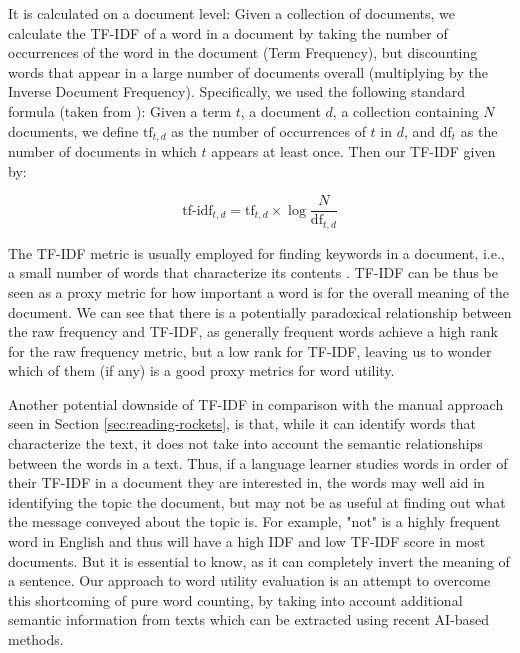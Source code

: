 It is calculated on a document level:
Given a collection of documents, we calculate the TF-IDF of a word in a document by taking the number of occurrences of the word in the document (Term Frequency), but discounting words that appear in a large number of documents overall (multiplying by the Inverse Document Frequency).
Specifically, we used the following standard formula (taken from \cite{qaiserTextMiningUse2018}):
Given a term $t$, a document $d$, a collection containing $N$ documents, we define $\text{tf}_{t,d}$ as the number of occurrences of $t$ in $d$, and $\text{df}_{t}$ as the number of documents in which $t$ appears at least once. Then our TF-IDF given by: 

\begin{equation}\label{eq:tfidf}
	\text{tf-idf}_{t,d} = \text{tf}_{t,d} \times \log \frac{N}{\text{df}_{t,d}}
\end{equation}


The TF-IDF metric is usually employed for finding keywords in a document, i.e., a small number of words that characterize its contents \cite{qaiserTextMiningUse2018}.
TF-IDF can be thus be seen as a proxy metric for how important a word is for the overall meaning of the document.
We can see that there is a potentially paradoxical relationship between the raw frequency and TF-IDF, as generally frequent words achieve a high rank for the raw frequency metric, but a low rank for TF-IDF, leaving us to wonder which of them (if any) is a good proxy metrics for word utility.

Another potential downside of TF-IDF in comparison with the manual approach seen in Section \ref{sec:reading-rockets}, is that, while it can identify words that characterize the text, it does not take into account the semantic relationships between the words in a text.
Thus, if a language learner studies words in order of their TF-IDF in a document they are interested in, the words may well aid in identifying the topic the document, but may not be as useful at finding out what the message conveyed about the topic is.
For example, "not" is a highly frequent word in English and thus will have a high IDF and low TF-IDF score in most documents.
But it is essential to know, as it can completely invert the meaning of a sentence.
Our approach to word utility evaluation is an attempt to overcome this shortcoming of pure word counting, by taking into account additional semantic information from texts which can be extracted using recent AI-based methods.

